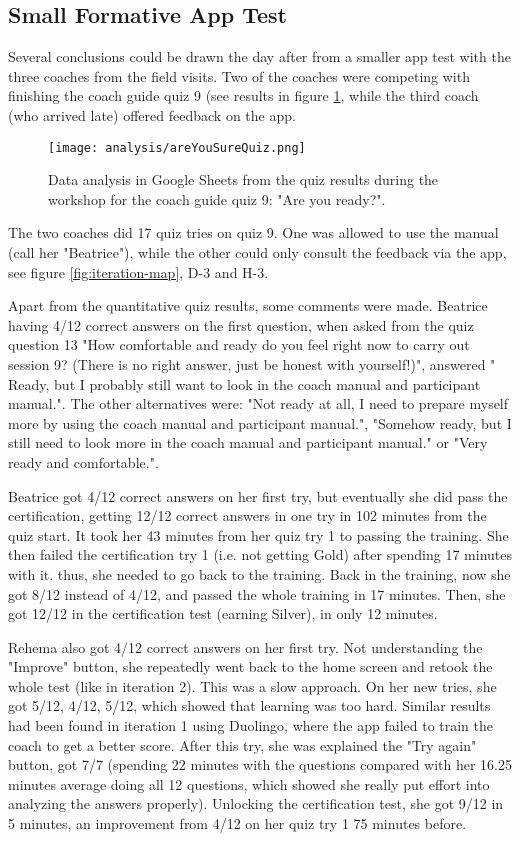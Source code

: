 \subsection{Small Formative App Test}

  Several conclusions could be drawn the day after from a smaller app test with the three coaches from the field visits. Two of the coaches were competing with finishing the coach guide quiz 9 (see results in figure \ref{fig:areYouReady}, while the third coach (who arrived late) offered feedback on the app.

  \begin{figure}[h]
    \centering
    \texttt{[image: analysis/areYouSureQuiz.png]}
    \caption{Data analysis in Google Sheets from the quiz results during the workshop for the coach guide quiz 9: "Are you ready?".}
    \label{fig:areYouReady}
  \end{figure}

  The two coaches did 17 quiz tries on quiz 9. One was allowed to use the manual (call her "Beatrice"), while the other could only consult the feedback via the app, see figure \ref{fig:iteration-map}, D-3 and H-3.

  Apart from the quantitative quiz results, some comments were made. Beatrice having 4/12 correct answers on the first question, when asked from the quiz question 13 "How comfortable and ready do you feel right now to carry out session 9? (There is no right answer, just be honest with yourself!)", answered " Ready, but I probably still want to look in the coach manual and participant manual.". The other alternatives were: "Not ready at all, I need to prepare myself more by using the coach manual and participant manual.", "Somehow ready, but I still need to look more in the coach manual and participant manual." or "Very ready and comfortable.".

  Beatrice got 4/12 correct answers on her first try, but eventually she did pass the certification, getting 12/12 correct answers in one try in 102 minutes from the quiz start. It took her 43 minutes from her quiz try 1 to passing the training. She then failed the certification try 1 (i.e. not getting Gold) after spending 17 minutes with it. thus, she needed to go back to the training. Back in the training, now she got 8/12 instead of 4/12, and passed the whole training in 17 minutes. Then, she got 12/12 in the certification test (earning Silver), in only 12 minutes.

  Rehema also got 4/12 correct answers on her first try. Not understanding the "Improve" button, she repeatedly went back to the home screen and retook the whole test (like in iteration 2). This was a slow approach. On her new tries, she got 5/12, 4/12, 5/12, which showed that learning was too hard. Similar results had been found in iteration 1 using Duolingo, where the app failed to train the coach to get a better score. After this try, she was explained the "Try again" button, got 7/7 (spending 22 minutes with the questions compared with her 16.25 minutes average doing all 12 questions, which showed she really put effort into analyzing the answers properly). Unlocking the certification test, she got 9/12 in 5 minutes, an improvement from 4/12 on her quiz try 1 75 minutes before.

